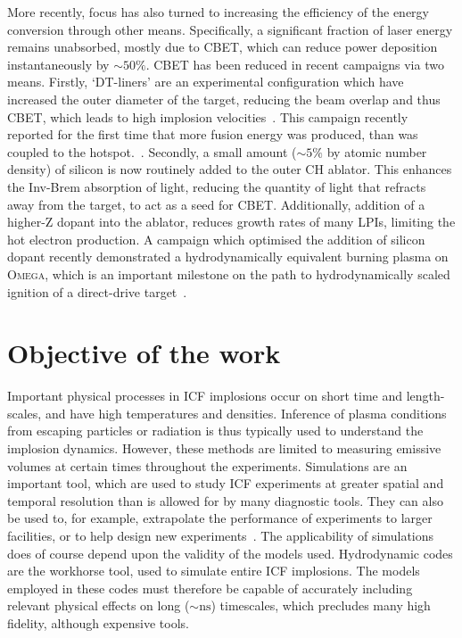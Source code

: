 More recently, focus has also turned to increasing the efficiency of the energy conversion through other means.
Specifically, a significant fraction of laser energy remains unabsorbed, mostly due to \ac{CBET}, which can reduce power deposition instantaneously by $\sim50\%$.
\ac{CBET} has been reduced in recent campaigns via two means.
Firstly, `DT-liners' are an experimental configuration which have increased the outer diameter of the target, reducing the beam overlap and thus \ac{CBET}, which leads to high implosion velocities~\cite{williams_high_2021}.
This campaign recently reported for the first time that more fusion energy was produced, than was coupled to the hotspot.~\cite{williams_demonstration_2024}.
Secondly, a small amount ($\sim5\%$ by atomic number density) of silicon is now routinely added to the outer CH ablator.
This enhances the \ac{Inv-Brem} absorption of light, reducing the quantity of light that refracts away from the target, to act as a seed for \ac{CBET}.
Additionally, addition of a higher-Z dopant into the ablator, reduces growth rates of many \ac{LPIs}, limiting the hot electron production.
A campaign which optimised the addition of silicon dopant recently demonstrated a hydrodynamically equivalent burning plasma on \textsc{Omega}, which is an important milestone on the path to hydrodynamically scaled ignition of a direct-drive target~\cite{gopalaswamy_demonstration_2024}.

\section{Objective of the work}%
\label{sec:intro_objective}

Important physical processes in \ac{ICF} implosions occur on short time and length-scales, and have high temperatures and densities.
Inference of plasma conditions from escaping particles or radiation is thus typically used to understand the implosion dynamics.
However, these methods are limited to measuring emissive volumes at certain times throughout the experiments.
Simulations are an important tool, which are used to study \ac{ICF} experiments at greater spatial and temporal resolution than is allowed for by many diagnostic tools.
They can also be used to, for example, extrapolate the performance of experiments to larger facilities, or to help design new experiments~\cite{kritcher_design_2022}.
The applicability of simulations does of course depend upon the validity of the models used.
Hydrodynamic codes are the workhorse tool, used to simulate entire \ac{ICF} implosions.
The models employed in these codes must therefore be capable of accurately including relevant physical effects on long ($\sim\text{ns}$) timescales, which precludes many high fidelity, although expensive tools.

